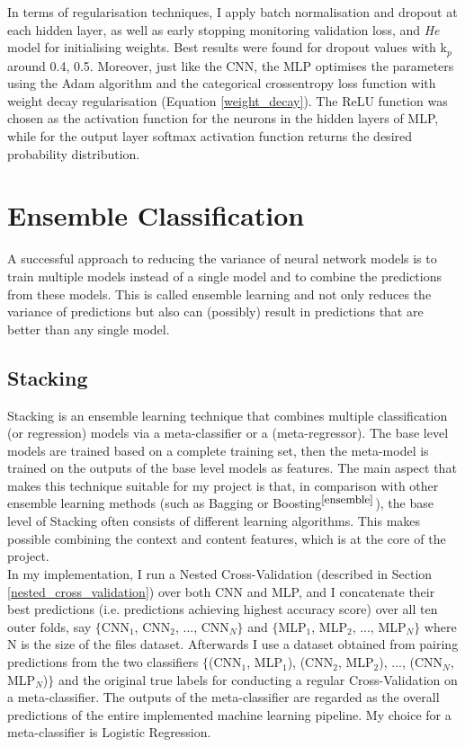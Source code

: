 In terms of regularisation techniques, I apply batch normalisation and dropout at each hidden layer, as well as early stopping monitoring validation loss, and \textit{He} model for initialising weights. Best results were found for dropout values with k$_p$ around 0.4, 0.5. Moreover, just like the CNN, the MLP optimises the parameters using the Adam algorithm and the categorical crossentropy loss function with weight decay regularisation (Equation \ref{weight_decay}). The ReLU function was chosen as the activation function for the neurons in the hidden layers of MLP, while for the output layer softmax activation function returns the desired probability distribution. 


\section{Ensemble Classification}

A successful approach to reducing the variance of neural network models is to train multiple models instead of a single model and to combine the predictions from these models. This is called ensemble learning and not only reduces the variance of predictions but also can (possibly) result in predictions that are better than any single model. 

\subsection{Stacking}

Stacking is an ensemble learning technique that combines multiple classification (or regression) models via a meta-classifier or a (meta-regressor). The base level models are trained based on a complete training set, then the meta-model is trained on the outputs of the base level models as features. The main aspect that makes this technique suitable for my project is that, in comparison with other ensemble learning methods (such as Bagging or Boosting$^{\small \cite{ensemble}}$), the base level of Stacking often consists of different learning algorithms. This makes possible combining the context and content features, which is at the core of the project.\\

In my implementation, I run a Nested Cross-Validation (described in Section \ref{nested_cross_validation}) over both CNN and MLP, and I concatenate their best predictions (i.e. predictions achieving highest accuracy score) over all ten outer folds, say $\{$CNN$_1$, CNN$_2$, ..., CNN$_N$$\}$ and $\{$MLP$_1$, MLP$_2$, ..., MLP$_N$$\}$ where N is the size of the files dataset. 
Afterwards I use a dataset obtained from pairing predictions from the two classifiers $\{$(CNN$_1$, MLP$_1$), (CNN$_2$, MLP$_2$), ..., (CNN$_N$, MLP$_N$)$\}$ and the original true labels for conducting a regular Cross-Validation on a meta-classifier. The outputs of the meta-classifier are regarded as the overall predictions of the entire implemented machine learning pipeline. My choice for a meta-classifier is Logistic Regression. 

